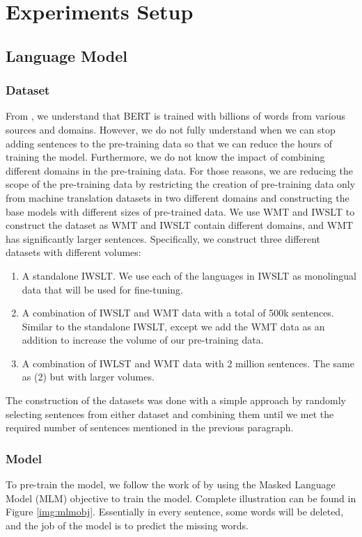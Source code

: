 \section{Experiments Setup}
\subsection{Language Model}
\label{ssec:langmodel}
\subsubsection{Dataset}
From \cite{devlin2018bert}, we understand that BERT is trained with billions of words from various sources and domains. However, we do not fully understand when we can stop adding sentences to the pre-training data so that we can reduce the hours of training the model. Furthermore, we do not know the impact of combining different domains in the pre-training data. For those reasons, we are reducing the scope of the pre-training data by restricting the creation of pre-training data only from machine translation datasets in two different domains and constructing the base models with different sizes of pre-trained data. We use WMT and IWSLT to construct the dataset as WMT and IWSLT contain different domains, and WMT has significantly larger sentences. Specifically, we construct three different datasets with different volumes:
\begin{enumerate}
    \item A standalone IWSLT. We use each of the languages in IWSLT as monolingual data that will be used for fine-tuning.
    \item A combination of IWSLT and WMT data with a total of 500k sentences. Similar to the standalone IWSLT, except we add the WMT data as an addition to increase the volume of our pre-training data.
    \item A combination of IWLST and WMT data with 2 million sentences. The same as (2) but with larger volumes.
\end{enumerate}

The construction of the datasets was done with a simple approach by randomly selecting sentences from either dataset and combining them until we met the required number of sentences mentioned in the previous paragraph.

\subsubsection{Model}
To pre-train the model, we follow the work of \cite{devlin2018bert} by using the Masked Language Model (MLM) objective to train the model. Complete illustration can be found in Figure \ref{img:mlmobj}. Essentially in every sentence, some words will be deleted, and the job of the model is to predict the missing words.

